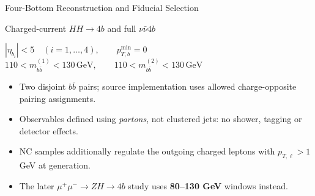 \documentclass[aspectratio=1610,english]{beamer}
\newcommand{\src}[1]{\vfill{\par\color{black!65}\fontsize{6.4}{7.4}\selectfont\emph{Source:} #1\par}}
\begin{document}
\begin{frame}[t]{Four-Bottom Reconstruction and Fiducial Selection}
\small

\begin{block}{Charged-current $HH\to4b$ and full $\nu\bar\nu4b$}
\begin{center}\large
$|\eta_{b_i}|<5\quad(i=1,\dots,4),\qquad p_{T,b}^{\min}=0$\\[.7em]
$110<m_{b\bar b}^{(1)}<130\,\mathrm{GeV},\qquad 110<m_{b\bar b}^{(2)}<130\,\mathrm{GeV}$
\end{center}
\end{block}
\begin{itemize}
\item Two disjoint $b\bar b$ pairs; source implementation uses allowed charge-opposite pairing assignments.
\item Observables defined using \emph{partons}, not clustered jets: no shower, tagging or detector effects.
\item NC samples additionally regulate the outgoing charged leptons with $p_{T,\ell}>1$ GeV at generation.
\item The later $\mu^+\mu^-\to ZH\to4b$ study uses \textbf{80--130 GeV} windows instead.
\end{itemize}

\end{frame}
\end{document}
